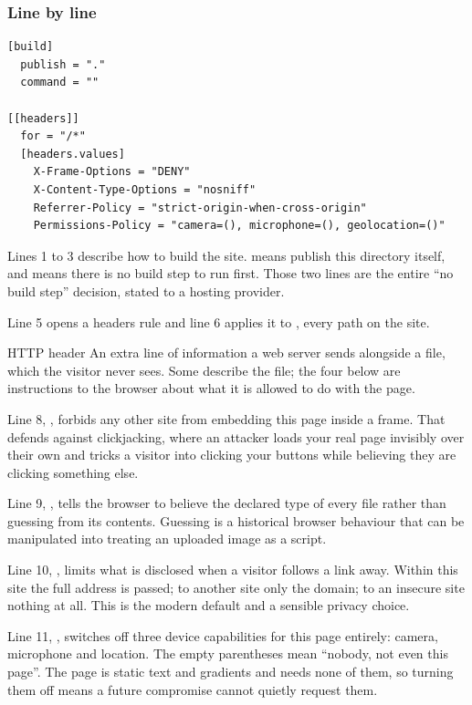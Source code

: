 \subsubsection*{Line by line}

\begin{lstlisting}[firstnumber=1,caption={\file{netlify.toml}, lines 1--11}]
[build]
  publish = "."
  command = ""

[[headers]]
  for = "/*"
  [headers.values]
    X-Frame-Options = "DENY"
    X-Content-Type-Options = "nosniff"
    Referrer-Policy = "strict-origin-when-cross-origin"
    Permissions-Policy = "camera=(), microphone=(), geolocation=()"
\end{lstlisting}

Lines 1 to 3 describe how to build the site.  means publish this
directory itself, and  means there is no build step to run first.
Those two lines are the entire ``no build step'' decision, stated to a hosting
provider.

Line 5 opens a headers rule and line 6 applies it to \code{/*}, every path on the
site.

\begin{jargon}{HTTP header}
An extra line of information a web server sends alongside a file, which the visitor
never sees. Some describe the file; the four below are instructions to the browser
about what it is allowed to do with the page.
\end{jargon}

Line 8, , forbids any other site from embedding this
page inside a frame. That defends against clickjacking, where an attacker loads your
real page invisibly over their own and tricks a visitor into clicking your buttons
while believing they are clicking something else.

Line 9, , tells the browser to believe the
declared type of every file rather than guessing from its contents. Guessing is a
historical browser behaviour that can be manipulated into treating an uploaded image
as a script.

Line 10, , limits what is
disclosed when a visitor follows a link away. Within this site the full address is
passed; to another site only the domain; to an insecure site nothing at all. This is
the modern default and a sensible privacy choice.

Line 11, , switches off three device capabilities for this
page entirely: camera, microphone and location. The empty parentheses mean ``nobody,
not even this page''. The page is static text and gradients and needs none of them,
so turning them off means a future compromise cannot quietly request them.

